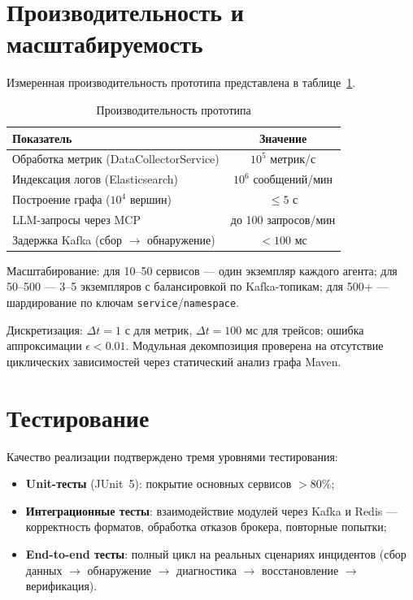 \section{Производительность и масштабируемость}

Измеренная производительность прототипа представлена в таблице~\ref{tab:prototype_performance}.

\begin{table}[H]
\centering
\small
\caption{Производительность прототипа}
\label{tab:prototype_performance}
\begin{tabular}{|p{6cm}|c|}
\hline
\textbf{Показатель} & \textbf{Значение} \\
\hline
Обработка метрик (DataCollectorService) & $10^5$ метрик/с \\
\hline
Индексация логов (Elasticsearch) & $10^6$ сообщений/мин \\
\hline
Построение графа ($10^4$ вершин) & $\leq 5$ с \\
\hline
LLM-запросы через MCP & до 100 запросов/мин \\
\hline
Задержка Kafka (сбор $\to$ обнаружение) & $< 100$ мс \\
\hline
\end{tabular}
\end{table}

Масштабирование: для 10--50 сервисов --- один экземпляр каждого агента; для 50--500 --- 3--5 экземпляров с балансировкой по Kafka-топикам; для 500+ --- шардирование по ключам \texttt{service}/\texttt{namespace}.

Дискретизация: $\Delta t = 1$ с для метрик, $\Delta t = 100$ мс для трейсов; ошибка аппроксимации $\epsilon < 0.01$. Модульная декомпозиция проверена на отсутствие циклических зависимостей через статический анализ графа Maven.

\section{Тестирование}

Качество реализации подтверждено тремя уровнями тестирования:
\begin{itemize}
  \item \textbf{Unit-тесты} (JUnit~5): покрытие основных сервисов $> 80\%$;
  \item \textbf{Интеграционные тесты}: взаимодействие модулей через Kafka и Redis --- корректность форматов, обработка отказов брокера, повторные попытки;
  \item \textbf{End-to-end тесты}: полный цикл на реальных сценариях инцидентов (сбор данных $\rightarrow$ обнаружение $\rightarrow$ диагностика $\rightarrow$ восстановление $\rightarrow$ верификация).
\end{itemize}

